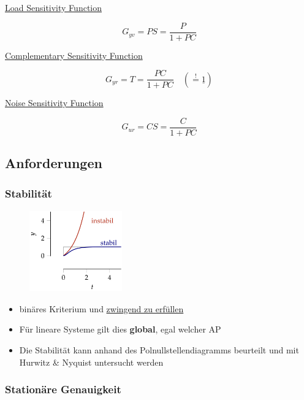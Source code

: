 \documentclass[
  10pt,
  a4paper,
  twocolumn]{article}
\providecommand{\tightlist}{%
  \setlength{\itemsep}{0pt}\setlength{\parskip}{0pt}}\usepackage{longtable,booktabs,array}
\numberwithin{equation}{section}
\begin{document}
\underline{\footnotesize{Load Sensitivity Function}}

\[
G_{yv} = PS = \frac{P}{1+PC} 
\]

\underline{\footnotesize{Complementary Sensitivity Function}}

\[
G_{yr} = T = \frac{PC}{1+PC}\quad (\stackrel{!}{=} \underline{1})
\]

\underline{\footnotesize{Noise Sensitivity Function}}

\[
G_{ur} = CS = \frac{C}{1+PC} 
\]

\hypertarget{anforderungen}{%
\subsection{Anforderungen}\label{anforderungen}}

\hypertarget{stabilituxe4t-1}{%
\subsubsection{Stabilität}\label{stabilituxe4t-1}}

\begin{figure}[H]

{\centering \includegraphics[width=4cm,height=3.5cm]{images/paste-11.png}

}

\end{figure}

\begin{itemize}
\tightlist
\item
  binäres Kriterium und \ul{zwingend zu erfüllen}
\item
  Für lineare Systeme gilt dies \textbf{global}, egal welcher AP
\item
  Die Stabilität kann anhand des Polnullstellendiagramms beurteilt und
  mit Hurwitz \& Nyquist untersucht werden
\end{itemize}

\hypertarget{stationuxe4re-genauigkeit}{%
\subsubsection{Stationäre Genauigkeit}\label{stationuxe4re-genauigkeit}}
\end{document}
